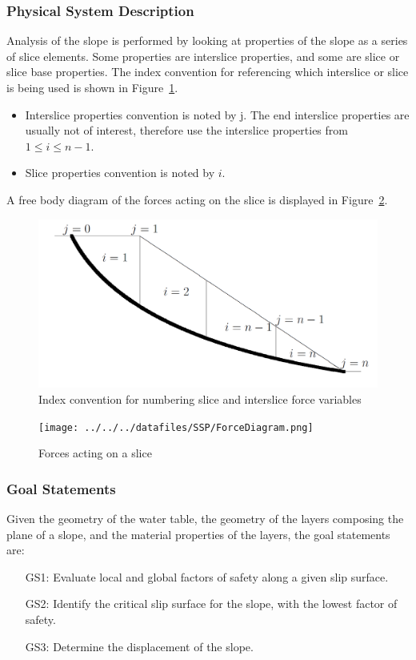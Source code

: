 \documentclass[12pt]{article}
\begin{document}
\subsubsection{Physical System Description}
\label{Sec:PhysSyst}
Analysis of the slope is performed by looking at properties of the slope as a series of slice elements. Some properties are interslice properties, and some are slice or slice base properties. The index convention for referencing which interslice or slice is being used is shown in Figure~\ref{Figure:IndexConvention}.
\begin{itemize}
\item{Interslice properties convention is noted by j. The end interslice properties are usually not of interest, therefore use the interslice properties from $1\leq{}i\leq{}n-1$.}
\item{Slice properties convention is noted by $i$.}
\end{itemize}
A free body diagram of the forces acting on the slice is displayed in Figure~\ref{Figure:ForceDiagram}.
\begin{figure}
\begin{center}
\includegraphics[width=\textwidth]{../../../datafiles/SSP/IndexConvention.png}
\caption{Index convention for numbering slice and interslice force variables}
\label{Figure:IndexConvention}
\end{center}
\end{figure}
\begin{figure}
\begin{center}
\texttt{[image: ../../../datafiles/SSP/ForceDiagram.png]}
\caption{Forces acting on a slice}
\label{Figure:ForceDiagram}
\end{center}
\end{figure}
\subsubsection{Goal Statements}
\label{Sec:GoalStmt}
Given the geometry of the water table, the geometry of the layers composing the plane of a slope, and the material properties of the layers, the goal statements are:
\begin{itemize}
\item[GS1:]Evaluate local and global factors of safety along a given slip surface.
\item[GS2:]Identify the critical slip surface for the slope, with the lowest factor of safety.
\item[GS3:]Determine the displacement of the slope.
\end{itemize}
\end{document}
